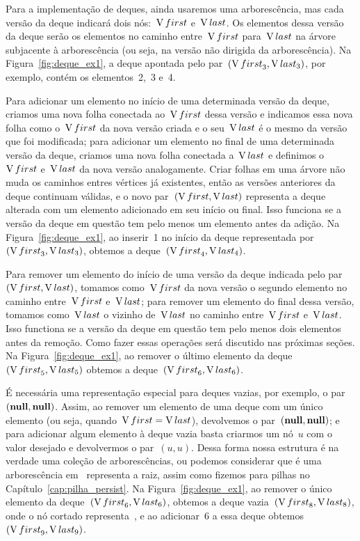\documentclass[main.tex]{subfiles}
\begin{document}
Para a implementação de deques, ainda usaremos uma arborescência, mas cada versão da deque indicará dois nós:~$\operatorname{V}{first}$ e~$\operatorname{V}{last}$. Os elementos dessa versão da deque serão os elementos no caminho entre~$\operatorname{V}{first}$ para~$\operatorname{V}{last}$ na árvore subjacente à arborescência (ou seja, na versão não dirigida da arborescência). Na Figura~\ref{fig:deque_ex1}, a deque apontada pelo par~$(\operatorname{V}{first}_3, \operatorname{V}{last}_3)$, por exemplo, contém os elementos~2,~3 e~4.

Para adicionar um elemento no início de uma determinada versão da deque, criamos uma nova folha conectada ao~$\operatorname{V}{first}$ dessa versão e indicamos essa nova folha como o~$\operatorname{V}{first}$ da nova versão criada e o seu~$\operatorname{V}{last}$ é o mesmo da versão que foi modificada; para adicionar um elemento no final de uma determinada versão da deque, criamos uma nova folha conectada a~$\operatorname{V}{last}$ e definimos o~$\operatorname{V}{first}$ e~$\operatorname{V}{last}$ da nova versão analogamente. Criar folhas em uma árvore não muda os caminhos entres vértices já existentes, então as versões anteriores da deque continuam válidas, e o novo par~$(\operatorname{V}{first}, \operatorname{V}{last})$ representa a deque alterada com um elemento adicionado em seu início ou final. Isso funciona se a versão da deque em questão tem pelo menos um elemento antes da adição. Na Figura~\ref{fig:deque_ex1}, ao inserir~1 no início da deque representada por~$(\operatorname{V}{first}_3, \operatorname{V}{last_3})$, obtemos a deque~$(\operatorname{V}{first}_4, \operatorname{V}{last}_4)$.

Para remover um elemento do início de uma versão da deque indicada pelo par~$(\operatorname{V}{first}, \operatorname{V}{last})$, tomamos como~$\operatorname{V}{first}$ da nova versão o segundo elemento no caminho entre~$\operatorname{V}{first}$ e~$\operatorname{V}{last}$; para remover um elemento do final dessa versão, tomamos como~$\operatorname{V}{last}$ o vizinho de~$\operatorname{V}{last}$ no caminho entre~$\operatorname{V}{first}$ e~$\operatorname{V}{last}$. Isso functiona se a versão da deque em questão tem pelo menos dois elementos antes da remoção. Como fazer essas operações será discutido nas próximas seções. Na Figura~\ref{fig:deque_ex1}, ao remover o último elemento da deque~$(\operatorname{V}{first}_5, \operatorname{V}{last}_5)$ obtemos a deque~$(\operatorname{V}{first}_6, \operatorname{V}{last}_6)$.

É necessária uma representação especial para deques vazias, por exemplo, o par~$(\textbf{null}, \textbf{null})$. Assim, ao remover um elemento de uma deque com um único elemento (ou seja, quando~$\operatorname{V}{first}=\operatorname{V}{last}$), devolvemos o par~$(\textbf{null}, \textbf{null})$; e para adicionar algum elemento à deque vazia basta criarmos um nó~$u$ com o valor desejado e devolvermos o par~$(u, u)$. Dessa forma nossa estrutura é na verdade uma coleção de arborescências, ou podemos considerar que é uma arborescência em~ representa a raiz, assim como fizemos para pilhas no Capítulo~\ref{cap:pilha_persist}. Na Figura~\ref{fig:deque_ex1}, ao remover o único elemento da deque~$(\operatorname{V}{first}_6, \operatorname{V}{last}_6)$, obtemos a deque vazia~$(\operatorname{V}{first}_8, \operatorname{V}{last}_8)$, onde o nó cortado representa~, e ao adicionar~6 a essa deque obtemos~$(\operatorname{V}{first}_9, \operatorname{V}{last}_9)$.
\end{document}
